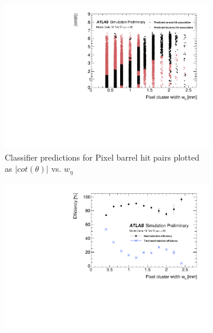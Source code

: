 
\begin{figure}[!htbp]
\centering
    \begin{subfigure}[a]{0.91\textwidth}
        \includegraphics[width=\linewidth]{images/4-ml-based-predictor/scatter_kde_predictions.pdf}
        \caption{Classifier predictions for Pixel barrel hit pairs plotted as $\lvert cot(\theta) \rvert$ vs. $w_{\eta}$}
    \end{subfigure}
    \hfill
    \begin{subfigure}[b]{0.91\textwidth}
        \centering
        \includegraphics[width=\linewidth]{images/4-ml-based-predictor/triplet_eff_metrics.pdf}

\end{subfigure}
\end{figure}
